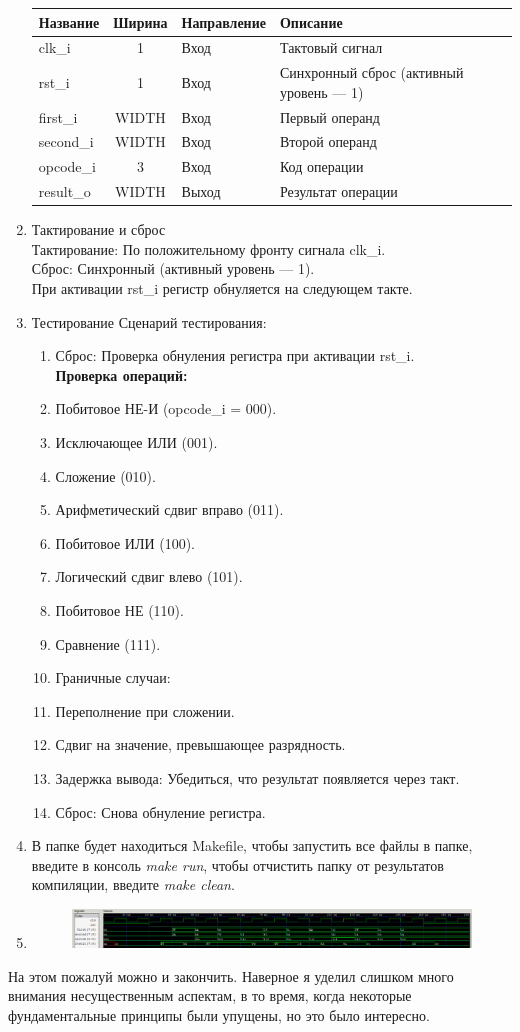 \documentclass[a4paper,12pt]{article} %
\begin{document}
\begin{enumerate}
\begin{table}[H]
\begin{tabular}{|l|c|l|p{6cm}|}
\textbf{Название} & \textbf{Ширина} & \textbf{Направление} & \textbf{Описание} \\ \hline
clk\_i    & 1      & Вход    & Тактовый сигнал \\ \hline
rst\_i    & 1      & Вход    & Синхронный сброс (активный уровень — 1) \\ \hline
first\_i  & WIDTH  & Вход    & Первый операнд \\ \hline
second\_i & WIDTH  & Вход    & Второй операнд \\ \hline
opcode\_i & 3      & Вход    & Код операции \\ \hline
result\_o & WIDTH  & Выход   & Результат операции \\ \hline
\end{tabular}
\end{table}
\item
Тактирование и сброс\\
Тактирование: По положительному фронту сигнала clk\_i.\\
Сброс: Синхронный (активный уровень — 1).\\
При активации rst\_i регистр обнуляется на следующем такте.
\item 
Тестирование
Сценарий тестирования:
\begin{enumerate}
\item Сброс: Проверка обнуления регистра при активации rst\_i.\\
\textbf{Проверка операций:}
\item Побитовое НЕ-И (opcode\_i = 000).
\item Исключающее ИЛИ (001).
\item Сложение (010).
\item Арифметический сдвиг вправо (011).
\item Побитовое ИЛИ (100).
\item Логический сдвиг влево (101).
\item Побитовое НЕ (110).
\item Сравнение (111).
\item Граничные случаи:
\item Переполнение при сложении.
\item Сдвиг на значение, превышающее разрядность.
\item Задержка вывода: Убедиться, что результат появляется через такт.
\item Сброс: Снова обнуление регистра.
\end{enumerate}
\item В папке будет находиться Makefile, чтобы запустить все файлы в папке, введите в консоль \textit{make run}, чтобы отчистить папку от результатов компиляции, введите \textit{make clean}.
\item
\begin{figure}[H]
    \centering
    \includegraphics[width=1\linewidth]{Formal/tb.png}
\end{figure}
\end{enumerate}

На этом пожалуй можно и закончить. Наверное я уделил слишком много внимания несущественным аспектам, в то время, когда некоторые фундаментальные принципы были упущены, но это было интересно. 
\end{document}
